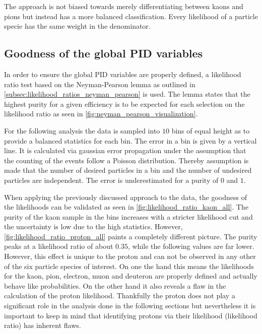 The approach is not biased towards merely differentiating between kaons and pions but instead has a more balanced classification. Every likelihood of a particle specie has the same weight in the denominator.

\subsection{Goodness of the global PID variables}
\label{subsec:pid_variables_global_pid_goodness}

In order to ensure the global PID variables are properly defined, a likelihood ratio test based on the Neyman-Pearson lemma as outlined in \autoref{subsec:likelihood_ratios_neyman_pearson} is used. The lemma states that the highest purity for a given efficiency is to be expected for each selection on the likelihood ratio as seen in \autoref{fig:neyman_pearson_visualization}.

For the following analysis the data is sampled into $10$ bins of equal height as to provide a balanced statistics for each bin. The error in a bin is given by a vertical line. It is calculated via gaussian error propagation under the assumption that the counting of the events follow a Poisson distribution. Thereby assumption is made that the number of desired particles in a bin and the number of undesired particles are independent. The error is underestimated for a purity of $0$ and $1$.

When applying the previously discussed approach to the data, the goodness of the likelihoods can be validated as seen in \autoref{fig:likelihood_ratio_kaon_all}. The purity of the kaon sample in the bins increases with a stricter likelihood cut and the uncertainty is low due to the high statistics. However, \autoref{fig:likelihood_ratio_proton_all} paints a completely different picture. The purity peaks at a likelihood ratio of about $0.35$, while the following values are far lower. However, this effect is unique to the proton and can not be observed in any other of the six particle species of interest. On one the hand this means the likelihoods for the kaon, pion, electron, muon and deuteron are properly defined and actually behave like probabilities. On the other hand it also reveals a flaw in the calculation of the proton likelihood. Thankfully the proton does not play a significant role in the analysis done in the following sections but nevertheless it is important to keep in mind that identifying protons via their likelihood (likelihood ratio) has inherent flaws.

